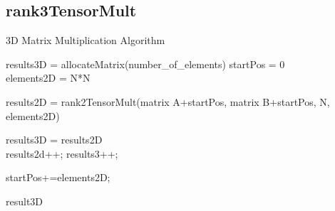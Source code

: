 \documentclass[10pt,onecolumn]{article}
\begin{document}
    \subsection{rank3TensorMult}
    \begin{algorithm}[H]
        \caption{3D Matrix Multiplication Algorithm}
        results3D = allocateMatrix(number\_of\_elements)
        startPos = 0\\
        elements2D = N*N\\
        { 
            results2D = rank2TensorMult(matrix A+startPos, matrix B+startPos, N, elements2D)
        
            \For{}
            {
                results3D = results2D\\
                results2d++; results3++;
                
            }
            startPos+=elements2D;
        }%
        \Return result3D 
    \end{algorithm}
\end{document}

